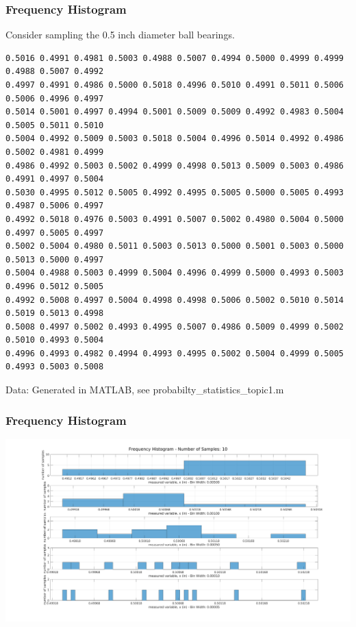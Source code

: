 \documentclass[fleqn]{beamer} %
\newcommand{\sectiontitleIII}{Frequency Histogram}
\begin{document}
	\begin{frame}[containsverbatim] \small
		\frametitle{\sectiontitleIII}    

Consider sampling the 0.5 inch diameter ball bearings.
		\begin{verbatim}
0.5016 0.4991 0.4981 0.5003 0.4988 0.5007 0.4994 0.5000 0.4999 0.4999 0.4988 0.5007 0.4992 
0.4997 0.4991 0.4986 0.5000 0.5018 0.4996 0.5010 0.4991 0.5011 0.5006 0.5006 0.4996 0.4997 
0.5014 0.5001 0.4997 0.4994 0.5001 0.5009 0.5009 0.4992 0.4983 0.5004 0.5005 0.5011 0.5010 
0.5004 0.4992 0.5009 0.5003 0.5018 0.5004 0.4996 0.5014 0.4992 0.4986 0.5002 0.4981 0.4999
0.4986 0.4992 0.5003 0.5002 0.4999 0.4998 0.5013 0.5009 0.5003 0.4986 0.4991 0.4997 0.5004
0.5030 0.4995 0.5012 0.5005 0.4992 0.4995 0.5005 0.5000 0.5005 0.4993 0.4987 0.5006 0.4997 
0.4992 0.5018 0.4976 0.5003 0.4991 0.5007 0.5002 0.4980 0.5004 0.5000 0.4997 0.5005 0.4997 
0.5002 0.5004 0.4980 0.5011 0.5003 0.5013 0.5000 0.5001 0.5003 0.5000 0.5013 0.5000 0.4997 
0.5004 0.4988 0.5003 0.4999 0.5004 0.4996 0.4999 0.5000 0.4993 0.5003 0.4996 0.5012 0.5005 
0.4992 0.5008 0.4997 0.5004 0.4998 0.4998 0.5006 0.5002 0.5010 0.5014 0.5019 0.5013 0.4998 
0.5008 0.4997 0.5002 0.4993 0.4995 0.5007 0.4986 0.5009 0.4999 0.5002 0.5010 0.4993 0.5004 
0.4996 0.4993 0.4982 0.4994 0.4993 0.4995 0.5002 0.5004 0.4999 0.5005 0.4993 0.5003 0.5008 
		\end{verbatim}
		
		{\tiny Data: Generated in MATLAB, see probabilty\_statistics\_topic1.m }

	\end{frame}

	\begin{frame} \small
		\frametitle{\sectiontitleIII}    

	\includegraphics[scale=.25]{topic2_histogram_fig1}


	\end{frame}
	
\end{document}
